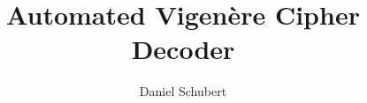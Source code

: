 \documentclass[12pt]{article}
\begin{document}
\title{Automated Vigenère Cipher Decoder}
\author{Daniel Schubert}
\maketitle
\end{document}

